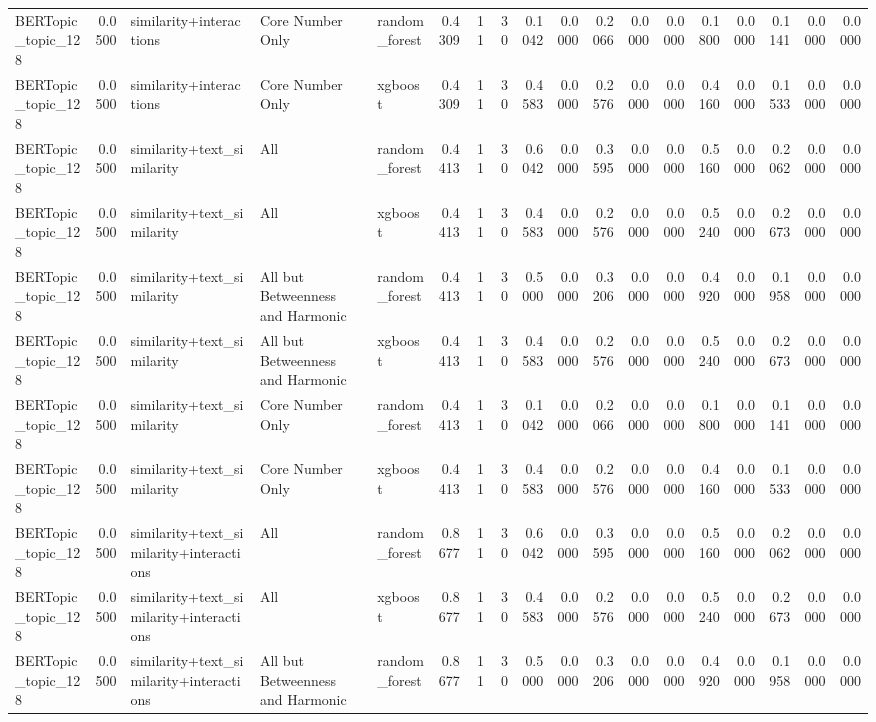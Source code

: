 \begin{tabular}{lrlllrrrrrrrrrrrrr}
BERTopic_topic_128 & 0.0500 & similarity+interactions & Core Number Only & random_forest & 0.4309 & 11 & 30 & 0.1042 & 0.0000 & 0.2066 & 0.0000 & 0.0000 & 0.1800 & 0.0000 & 0.1141 & 0.0000 & 0.0000 \\
BERTopic_topic_128 & 0.0500 & similarity+interactions & Core Number Only & xgboost & 0.4309 & 11 & 30 & 0.4583 & 0.0000 & 0.2576 & 0.0000 & 0.0000 & 0.4160 & 0.0000 & 0.1533 & 0.0000 & 0.0000 \\
BERTopic_topic_128 & 0.0500 & similarity+text_similarity & All & random_forest & 0.4413 & 11 & 30 & 0.6042 & 0.0000 & 0.3595 & 0.0000 & 0.0000 & 0.5160 & 0.0000 & 0.2062 & 0.0000 & 0.0000 \\
BERTopic_topic_128 & 0.0500 & similarity+text_similarity & All & xgboost & 0.4413 & 11 & 30 & 0.4583 & 0.0000 & 0.2576 & 0.0000 & 0.0000 & 0.5240 & 0.0000 & 0.2673 & 0.0000 & 0.0000 \\
BERTopic_topic_128 & 0.0500 & similarity+text_similarity & All but Betweenness and Harmonic & random_forest & 0.4413 & 11 & 30 & 0.5000 & 0.0000 & 0.3206 & 0.0000 & 0.0000 & 0.4920 & 0.0000 & 0.1958 & 0.0000 & 0.0000 \\
BERTopic_topic_128 & 0.0500 & similarity+text_similarity & All but Betweenness and Harmonic & xgboost & 0.4413 & 11 & 30 & 0.4583 & 0.0000 & 0.2576 & 0.0000 & 0.0000 & 0.5240 & 0.0000 & 0.2673 & 0.0000 & 0.0000 \\
BERTopic_topic_128 & 0.0500 & similarity+text_similarity & Core Number Only & random_forest & 0.4413 & 11 & 30 & 0.1042 & 0.0000 & 0.2066 & 0.0000 & 0.0000 & 0.1800 & 0.0000 & 0.1141 & 0.0000 & 0.0000 \\
BERTopic_topic_128 & 0.0500 & similarity+text_similarity & Core Number Only & xgboost & 0.4413 & 11 & 30 & 0.4583 & 0.0000 & 0.2576 & 0.0000 & 0.0000 & 0.4160 & 0.0000 & 0.1533 & 0.0000 & 0.0000 \\
BERTopic_topic_128 & 0.0500 & similarity+text_similarity+interactions & All & random_forest & 0.8677 & 11 & 30 & 0.6042 & 0.0000 & 0.3595 & 0.0000 & 0.0000 & 0.5160 & 0.0000 & 0.2062 & 0.0000 & 0.0000 \\
BERTopic_topic_128 & 0.0500 & similarity+text_similarity+interactions & All & xgboost & 0.8677 & 11 & 30 & 0.4583 & 0.0000 & 0.2576 & 0.0000 & 0.0000 & 0.5240 & 0.0000 & 0.2673 & 0.0000 & 0.0000 \\
BERTopic_topic_128 & 0.0500 & similarity+text_similarity+interactions & All but Betweenness and Harmonic & random_forest & 0.8677 & 11 & 30 & 0.5000 & 0.0000 & 0.3206 & 0.0000 & 0.0000 & 0.4920 & 0.0000 & 0.1958 & 0.0000 & 0.0000 \\

\end{tabular}
